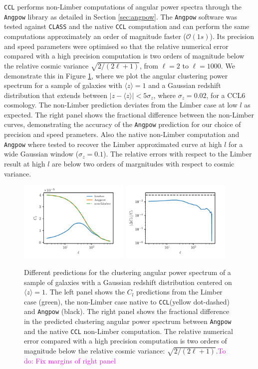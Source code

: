 \documentclass[\docopts]{\docclass}
\newcommand{\todo}[1]{\textcolor{magenta}{To do: #1}}
\newcommand{\ccl}{{\tt CCL}\xspace}
\begin{document}
\ccl performs non-Limber computations of angular power spectra through the {\tt Angpow} library as detailed in Section \ref{sec:angpow}. The \texttt{Angpow} software was tested against \texttt{CLASS} and the native \ccl computation and can perform the same computations approximately an order of magnitude faster ($\mathcal{O}(1s)$). 
Its precision and speed parameters were optimised so that the relative numerical error compared with a high precision computation is two orders of magnitude below the relative cosmic variance $\sqrt{2/(2\ell+1)}$, from $\ell=2$ to $\ell=1000$. We demonstrate this in Figure \ref{fig:angpow}, where we plot the angular clustering power spectrum for a sample of galaxies with $\langle z \rangle=1$ and a Gaussian redshift distribution that extends between $|z-\langle z \rangle|<5\sigma_z$, where $\sigma_z=0.02$, for a CCL6 cosmology. 
The non-Limber prediction deviates from the Limber case at low $l$ as expected. The right panel shows the fractional difference between the non-Limber curves, demonstrating the accuracy of the {\tt Angpow} prediction for our choice of precision and speed prameters.
Also the native non-Limber computation and {\tt Angpow} where tested to recover the Limber approximated curve at high $l$ for a wide Gaussian window ($\sigma_z=0.1$). The relative errors with respect to the Limber result at high $l$ are below two orders of margnitudes with respect to cosmic variance. 

\begin{figure}[htbp]
\centering
\includegraphics[width=0.47\textwidth]{angpow1}
\includegraphics[width=0.47\textwidth]{angpow3}
\caption{Different predictions for the clustering angular power spectrum of a sample of galaxies with a Gaussian redshift distribution centered on $\langle z \rangle =1$. The left panel shows the $C_l$ predictions from the Limber case (green), the non-Limber case native to \ccl (yellow dot-dashed) and {\tt Angpow} (black). The right panel shows the fractional difference in the predicted clustering angular power spectrum between {\tt Angpow} and the native \ccl non-Limber computation. The relative numerical error compared with a high precision computation is two orders of magnitude below the relative cosmic variance: $\sqrt{2/(2\ell+1)}$.\todo{Fix margins of right panel}}
\label{fig:angpow}
\end{figure}
\end{document}
